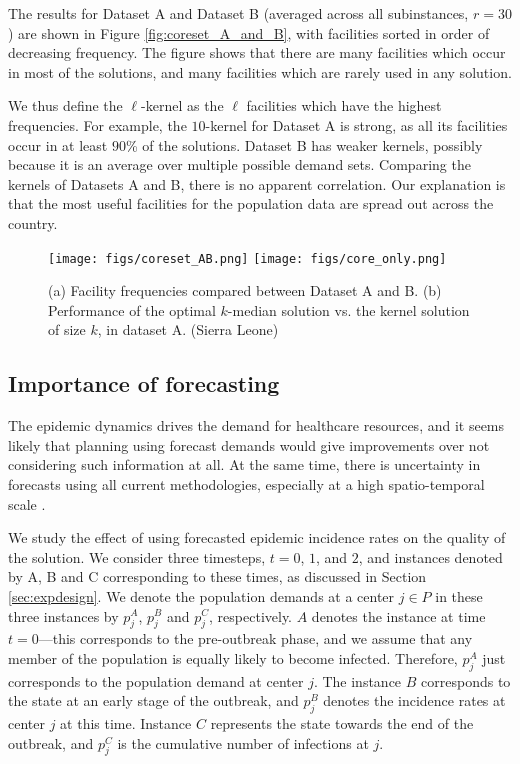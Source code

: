 The results for Dataset A and Dataset B (averaged across all subinstances, $r = 30$) are shown in Figure \ref{fig:coreset_A_and_B}, with facilities sorted in order of decreasing frequency. The figure shows that there are many facilities which occur in most of the solutions, and many facilities which are rarely used in any solution. 

We thus define the $\ell$-kernel as the $\ell$ facilities which have the highest frequencies. For example, the $10$-kernel for Dataset A is strong, as all its facilities occur in at least $90$\% of the solutions. Dataset B has weaker kernels, possibly because it is an average over multiple possible demand sets. Comparing the kernels of Datasets A and B, there is no apparent correlation. Our explanation is that the most useful facilities for the population data are spread out across the country.


\begin{figure}[h]
  \centering
    \texttt{[image: figs/coreset\_AB.png]}
    \texttt{[image: figs/core\_only.png]}
\caption{
(a) Facility frequencies compared between Dataset A and B.
(b) Performance of the optimal $k$-median solution vs. the kernel solution of size $k$, in dataset A. (Sierra Leone)
} 
        \label{fig:coreset_AB}
\end{figure}





\subsection*{Importance of forecasting}
The epidemic dynamics drives the demand for healthcare resources, and it seems
likely that planning using forecast demands would give improvements over not
considering such information at all. At the same time, there is uncertainty
in forecasts using all current methodologies, especially at a high
spatio-temporal scale \cite{chakraborty:sdm14}.

We study the effect of using forecasted epidemic incidence rates on the
quality of the solution. We consider three timesteps, $t=0$, $1$, and $2$, and
instances denoted by A, B and C corresponding to these times, as discussed in Section \ref{sec:expdesign}.
We denote the population demands at a center $j\in P$ in these three instances
by $p_j^A$, $p_j^B$ and $p_j^C$, respectively.
$A$ denotes the instance at time $t=0$---this
corresponds to the pre-outbreak phase, and 
we assume that any member of the population is equally likely to become infected.
Therefore, $p^A_j$ just corresponds to the population demand at center $j$.
The instance $B$ corresponds to the state at an early stage of the outbreak,
and $p^B_j$ denotes the incidence rates at center $j$ at this time.
Instance $C$ represents the state towards the end of the outbreak,
and $p^C_j$ is the cumulative number of infections at $j$.

